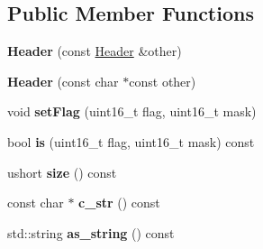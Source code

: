 \subsection*{Public Member Functions}
\begin{DoxyCompactItemize}
\item 
{\bfseries Header} (const \hyperlink{structdns_1_1Header}{Header} \&other)\hypertarget{structdns_1_1Header_ab7d03fd2cec0659afe0df11f59a3b4da}{}\label{structdns_1_1Header_ab7d03fd2cec0659afe0df11f59a3b4da}

\item 
{\bfseries Header} (const char $\ast$const other)\hypertarget{structdns_1_1Header_a5195a1241799e64eea7c5061f81a7c4e}{}\label{structdns_1_1Header_a5195a1241799e64eea7c5061f81a7c4e}

\item 
void {\bfseries set\+Flag} (uint16\+\_\+t flag, uint16\+\_\+t mask)\hypertarget{structdns_1_1Header_ac8629bfb54bfe73b2a85ad3ab04e4561}{}\label{structdns_1_1Header_ac8629bfb54bfe73b2a85ad3ab04e4561}

\item 
bool {\bfseries is} (uint16\+\_\+t flag, uint16\+\_\+t mask) const \hypertarget{structdns_1_1Header_aee9ceec6332d282f329b967cef1d285c}{}\label{structdns_1_1Header_aee9ceec6332d282f329b967cef1d285c}

\item 
ushort {\bfseries size} () const \hypertarget{structdns_1_1Header_abffe9b9ee5acba609e687535354ba6c8}{}\label{structdns_1_1Header_abffe9b9ee5acba609e687535354ba6c8}

\item 
const char $\ast$ {\bfseries c\+\_\+str} () const \hypertarget{structdns_1_1Header_a9b1a9610e54c5c0992fe6e756c8fadbb}{}\label{structdns_1_1Header_a9b1a9610e54c5c0992fe6e756c8fadbb}

\item 
std\+::string {\bfseries as\+\_\+string} () const \hypertarget{structdns_1_1Header_a8f7e8d1e1e08f9b6734a83fafa4aca7f}{}\label{structdns_1_1Header_a8f7e8d1e1e08f9b6734a83fafa4aca7f}

\end{DoxyCompactItemize}
